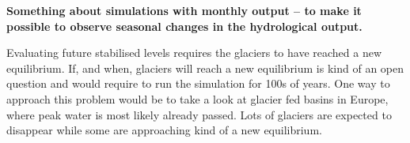 \documentclass[12pt, a4paper]{article}
\begin{document}
\textbf{Something about simulations with monthly output -- to make it possible to observe seasonal changes in the hydrological output.}

Evaluating future stabilised levels requires the glaciers to have reached a new
equilibrium. If, and when, glaciers will reach a new equilibrium is kind of an
open question and would require to run the simulation for 100s of years. One way
to approach this problem would be to take a look at glacier fed basins in
Europe, where peak water is most likely already passed. Lots of glaciers are
expected to disappear while some are approaching kind of a new equilibrium.





\printbibliography
\end{document}
